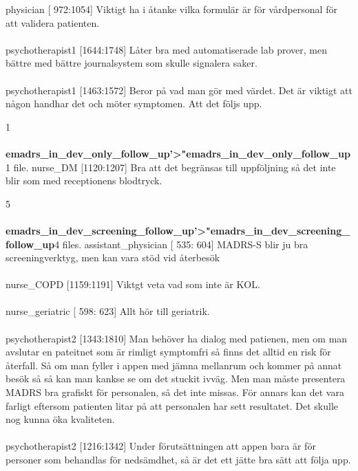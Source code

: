 \documentclass[12pt,a4paper,oneside]{article}
\begin{document}
 physician [ 972:1054] 
Viktigt ha i {\aa}tanke vilka formulär är f{\"o}r v{\aa}rdpersonal f{\"o}r att validera patienten. %
\\\ \\
 psychotherapist1 [1644:1748] 
L{\aa}ter bra med automatiserade lab prover, men bättre med bättre journalsystem som skulle signalera saker. %
\\\ \\
 psychotherapist1 [1463:1572] 
Beror p{\aa} vad man g{\"o}r med värdet. Det är viktigt att n{\aa}gon handhar det och m{\"o}ter symptomen. Att det f{\"o}ljs upp. %

1 \\\ \\{\bf emadrs\_in\_dev\_only\_follow\_up'>"emadrs\_in\_dev\_only\_follow\_up}1 file.
 nurse\_DM [1120:1207] 
Bra att det begränsas till uppf{\"o}ljning s{\aa} det inte blir som med receptionens blodtryck. %

5 \\\ \\{\bf emadrs\_in\_dev\_screening\_follow\_up'>"emadrs\_in\_dev\_screening\_follow\_up}4 files.
 assistant\_physician [ 535: 604] 
MADRS-S blir ju bra screeningverktyg, men kan vara st{\"o}d vid {\aa}terbes{\"o}k %
\\\ \\
 nurse\_COPD [1159:1191] 
Viktgt veta vad som inte är KOL. %
\\\ \\
 nurse\_geriatric [ 598: 623] 
Allt h{\"o}r till geriatrik.  %
\\\ \\
 psychotherapist2 [1343:1810] 
Man beh{\"o}ver ha dialog med patienen, men om man avslutar en pateitnet som är rimligt symptomfri s{\aa} finns det alltid en risk f{\"o}r {\aa}terfall. S{\aa} om man fyller i appen med jämna mellanrum och kommer p{\aa} annat bes{\"o}k s{\aa} s{\aa} kan man kankse se om det stuckit ivväg. Men man m{\aa}ste presentera MADRS bra grafiskt f{\"o}r personalen, s{\aa} det inte missas. F{\"o}r annars kan det vara farligt eftersom patienten litar p{\aa} att personalen har sett resultatet. Det skulle nog kunna {\"o}ka kvaliteten.  %
\\\ \\
 psychotherapist2 [1216:1342] 
Under f{\"o}rutsättningen att appen bara är f{\"o}r personer som behandlas f{\"o}r nedsämdhet, s{\aa} är det ett jätte bra sätt att f{\"o}lja upp. %
\end{document}
